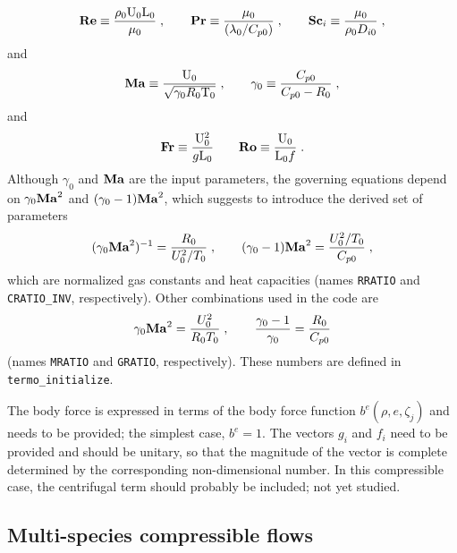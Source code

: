 \begin{equation}
  \mathrm{\bf Re} \equiv \frac{\rho_0 \mathrm{U}_0 \mathrm{L}_0}{\mu_0}\;, \qquad
  \mathrm{\bf Pr} \equiv \frac{\mu_0}{(\lambda_0/C_{p0})}\;, \qquad
  \mathrm{\bf Sc}_i \equiv \frac{\mu_0}{\rho_0 D_{i0}}\;,
\end{equation}
and
\begin{equation}
  \mathrm{\bf Ma}  \equiv \frac{\mathrm{U}_0}{\sqrt{\gamma_0 R_0 \mathrm{T}_0}}\;, \qquad
  \gamma_0 \equiv \frac{C_{p0}}{C_{p0}-R_0}\;,
\end{equation}
and
\begin{equation}
  \mathrm{\bf Fr} \equiv \frac{\mathrm{U}_0^2}{g\mathrm{L}_0} \qquad \mathrm{\bf Ro} \equiv \frac{\mathrm{U}_0}{\mathrm{L}_0f} \;.
\end{equation}
Although $\gamma_0$ and $\mathrm{\bf Ma}$ are the input parameters, the governing equations depend on $\gamma_0\mathrm{\bf Ma}^2$ and $(\gamma_0-1)\mathrm{\bf Ma}^2$, which suggests to introduce the derived set of parameters
\begin{equation}
    (\gamma_0\mathrm{\bf Ma}^2)^{-1}=\frac{R_0}{U^2_0/T_0}\;,\qquad (\gamma_0-1)\mathrm{\bf Ma}^2 =\frac{U_0^2/T_0}{C_{p0}} \;,
\end{equation}
which are normalized gas constants and heat capacities (names \texttt{RRATIO} and \texttt{CRATIO\_INV}, respectively). Other combinations used in the code are
\begin{equation}
    \gamma_0\mathrm{\bf Ma}^2=\frac{U_0^2}{R_0T_0}\;,\qquad \frac{\gamma_0-1}{\gamma_0}=\frac{R_0}{C_{p0}}
\end{equation}
(names \texttt{MRATIO} and \texttt{GRATIO}, respectively). These numbers are defined in \texttt{termo\_initialize}.

The body force is expressed in terms of the body force function $b^e(\rho,e,\zeta_j)$ and needs to be provided; the simplest case, $b^e=1$. The vectors $g_i$ and $f_i$ need to be provided and should be unitary, so that the magnitude of the vector is complete determined by the corresponding non-dimensional number. In this compressible case, the centrifugal term should probably be included; not yet studied.

\subsection{Multi-species compressible flows}

